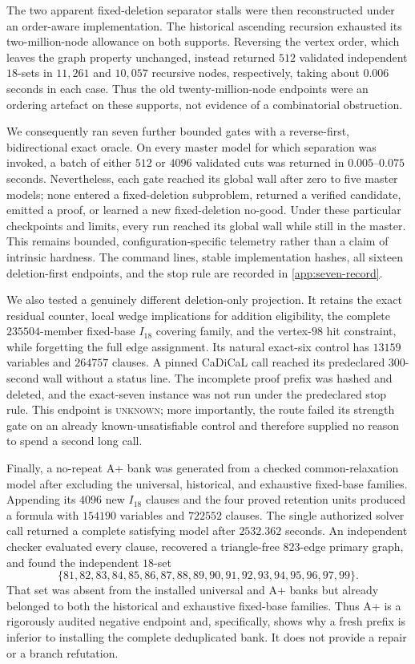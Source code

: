 The two apparent fixed-deletion separator stalls were then reconstructed under
an order-aware implementation.  The historical ascending recursion exhausted
its two-million-node allowance on both supports.  Reversing the vertex order,
which leaves the graph property unchanged, instead returned \(512\) validated
independent \(18\)-sets in \(11{,}261\) and \(10{,}057\) recursive nodes,
respectively, taking about \(0.006\) seconds in each case.  Thus the old
twenty-million-node endpoints were an ordering artefact on these supports,
not evidence of a combinatorial obstruction.

We consequently ran seven further bounded gates with a reverse-first,
bidirectional exact oracle.  On every master model for which separation was
invoked, a batch of either \(512\) or \(4096\) validated cuts was returned in
\(0.005\)--\(0.075\) seconds.  Nevertheless, each gate reached its global
wall after zero to five master models; none entered a fixed-deletion
subproblem, returned a verified candidate, emitted a proof, or learned a new
fixed-deletion no-good.  Under these particular checkpoints and limits, every
run reached its global wall while still in the master.  This remains bounded,
configuration-specific telemetry rather than a claim of intrinsic hardness.
The command lines, stable implementation hashes, all sixteen deletion-first
endpoints, and the stop rule are recorded in \cref{app:seven-record}.

We also tested a genuinely different deletion-only projection.  It retains
the exact residual counter, local wedge implications for addition
eligibility, the complete \(235504\)-member fixed-base \(I_{18}\) covering
family, and the vertex-\(98\) hit constraint, while forgetting the full edge
assignment.  Its natural exact-six control has \(13159\) variables and
\(264757\) clauses.  A pinned CaDiCaL call reached its predeclared
\(300\)-second wall without a status line.  The incomplete proof prefix was
hashed and deleted, and the exact-seven instance was not run under the
predeclared stop rule.  This endpoint is \textsc{unknown}; more importantly,
the route failed its strength gate on an already known-unsatisfiable control
and therefore supplied no reason to spend a second long call.

Finally, a no-repeat A+ bank was generated from a checked common-relaxation
model after excluding the universal, historical, and exhaustive fixed-base
families.  Appending its \(4096\) new \(I_{18}\) clauses and the four proved
retention units produced a formula with \(154190\) variables and \(722552\)
clauses.  The single authorized solver call returned a complete satisfying
model after \(2532.362\) seconds.  An independent checker evaluated every
clause, recovered a triangle-free \(823\)-edge primary graph, and found the
independent \(18\)-set
\[
 \{81,82,83,84,85,86,87,88,89,90,91,92,93,94,95,96,97,99\}.
\]
That set was absent from the installed universal and A+ banks but already
belonged to both the historical and exhaustive fixed-base families.  Thus A+
is a rigorously audited negative endpoint and, specifically, shows why a
fresh prefix is inferior to installing the complete deduplicated bank.  It
does not provide a repair or a branch refutation.

